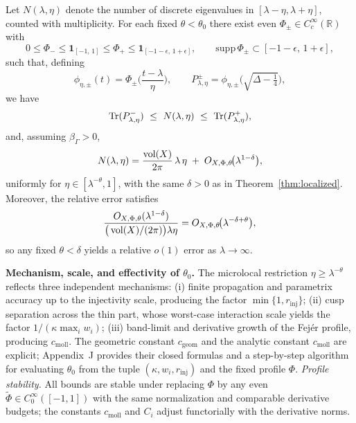 \begin{theorem}\label{thm:local-weyl}
Let $N(\lambda,\eta)$ denote the number of discrete eigenvalues in $[\lambda-\eta,\lambda+\eta]$, counted with multiplicity. For each fixed $\theta<\theta_0$ there exist even $\Phi_\pm\in C_c^\infty(\mathbb{R})$ with
\[
0\le\Phi_-\le\mathbf{1}_{[-1,\,1]}\le\Phi_+\le\mathbf{1}_{[-1-\epsilon,\,1+\epsilon]},\qquad \mathrm{supp}\,\Phi_\pm\subset[-1-\epsilon,\,1+\epsilon],
\]
such that, defining
\[
\phi_{\eta,\pm}(t)=\Phi_\pm\!\Big(\frac{t-\lambda}{\eta}\Big),\qquad 
P^\pm_{\lambda,\eta}=\phi_{\eta,\pm}\!\Big(\sqrt{\Delta-\tfrac14}\Big),
\]
we have
\begin{equation}\label{eq:tauber}
\Tr(P^-_{\lambda,\eta})\ \le\ N(\lambda,\eta)\ \le\ \Tr(P^+_{\lambda,\eta}),
\end{equation}
and, assuming $\beta_\Gamma>0$,
\begin{equation}\label{eq:local-weyl}
N(\lambda,\eta) = \frac{\operatorname{vol}(X)}{2\pi}\,\lambda\,\eta \;+\; O_{X,\Phi,\theta}\!\big(\lambda^{1-\delta}\big),
\end{equation}
uniformly for $\eta\in[\lambda^{-\theta},1]$, with the same $\delta>0$ as in Theorem~\ref{thm:localized}. Moreover, the relative error satisfies
\begin{equation}\label{eq:relative}
\frac{O_{X,\Phi,\theta}(\lambda^{1-\delta})}{\big(\operatorname{vol}(X)/(2\pi)\big)\lambda\eta} = O_{X,\Phi,\theta}\!\big(\lambda^{-\delta+\theta}\big),
\end{equation}
so any fixed $\theta<\delta$ yields a relative $o(1)$ error as $\lambda\to\infty$.
\end{theorem}

\medskip
\noindent\textbf{Mechanism, scale, and effectivity of $\theta_0$.}
The microlocal restriction $\eta\ge\lambda^{-\theta}$ reflects three independent mechanisms:
(i) finite propagation and parametrix accuracy up to the injectivity scale, producing the factor $\min\{1,r_{\mathrm{inj}}\}$; (ii) cusp separation across the thin part, whose worst-case interaction scale yields the factor $1/(\kappa\max_i w_i)$; (iii) band-limit and derivative growth of the Fejér profile, producing $c_{\mathrm{moll}}$. The geometric constant $c_{\mathrm{geom}}$ and the analytic constant $c_{\mathrm{moll}}$ are explicit; Appendix~J provides their closed formulas and a step-by-step algorithm for evaluating $\theta_0$ from the tuple $(\kappa,{w_i},r_{\mathrm{inj}})$ and the fixed profile $\Phi$. \emph{Profile stability.} All bounds are stable under replacing $\Phi$ by any even $\widetilde{\Phi}\in C_0^\infty([-1,1])$ with the same normalization and comparable derivative budgets; the constants $c_{\mathrm{moll}}$ and $C_i$ adjust functorially with the derivative norms.

